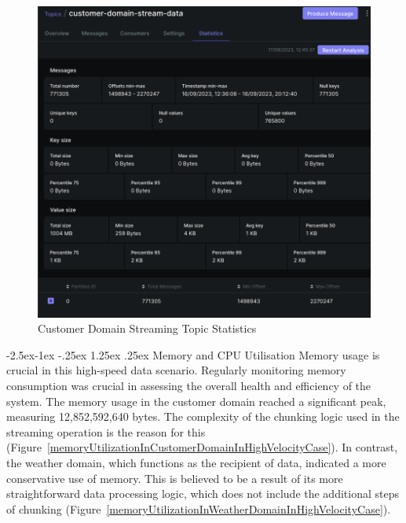 \documentclass[preprint,12pt]{elsarticle}
\makeatletter
\renewcommand\paragraph{\@startsection{paragraph}{4}{\z@}%
            {-2.5ex\@plus -1ex \@minus -.25ex}%
            {1.25ex \@plus .25ex}%
            {\normalfont\normalsize\itshape}}
\makeatother
\begin{document}
\begin{figure}

  \centering

  \includegraphics[width=\columnwidth]{images/customer-domain-stream-data-topic-statistics.png}

  \caption{Customer Domain Streaming Topic Statistics}

  \label{customerDomainStreamingTopicStatistics}

\end{figure}

\paragraph{Memory and CPU Utilisation} Memory usage is crucial in this high-speed data scenario. Regularly monitoring memory consumption was crucial in assessing the overall health and efficiency of the system. The memory usage in the customer domain reached a significant peak, measuring 12,852,592,640 bytes. The complexity of the chunking logic used in the streaming operation is the reason for this (Figure~\ref{memoryUtilizationInCustomerDomainInHighVelocityCase}). In contrast, the weather domain, which functions as the recipient of data, indicated a more conservative use of memory. This is believed to be a result of its more straightforward data processing logic, which does not include the additional steps of chunking (Figure~\ref{memoryUtilizationInWeatherDomainInHighVelocityCase}).
\end{document}
